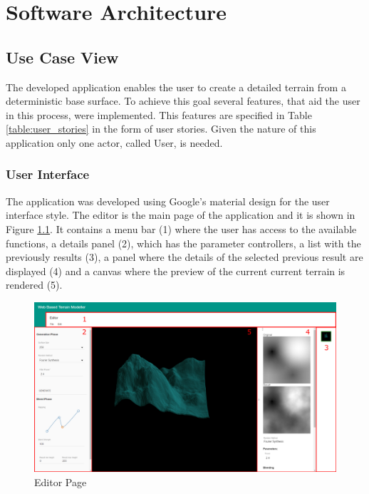 \chapter{Software Architecture} \label{chap:software_details}

  \section {Use Case View}
    
    The developed application enables the user to create a detailed terrain from a deterministic base surface. To achieve this goal several features, that aid the user in this process, were implemented. This features are specified in Table \ref{table:user_stories} in the form of user stories. Given the nature of this application only one actor, called User, is needed.
    
    
    
    
    \subsection {User Interface}
    
      The application was developed using Google's material design \cite{Google2016} for the user interface style. The editor is the main page of the application and it is shown in Figure \ref{fig:editor_page}. It contains a menu bar (1) where the user has access to the available functions, a details panel (2), which has the parameter controllers, a list with the previously results (3), a panel where the details of the selected previous result are displayed (4) and a canvas where the preview of the current current terrain is rendered (5).
      
      \begin{figure}[h!]
      	\centering
      	\includegraphics[width=0.95\linewidth]{images/screenshots/editorWithBoxes.pdf}
      	\caption{Editor Page}
      	\label{fig:editor_page}
      \end{figure}
      
